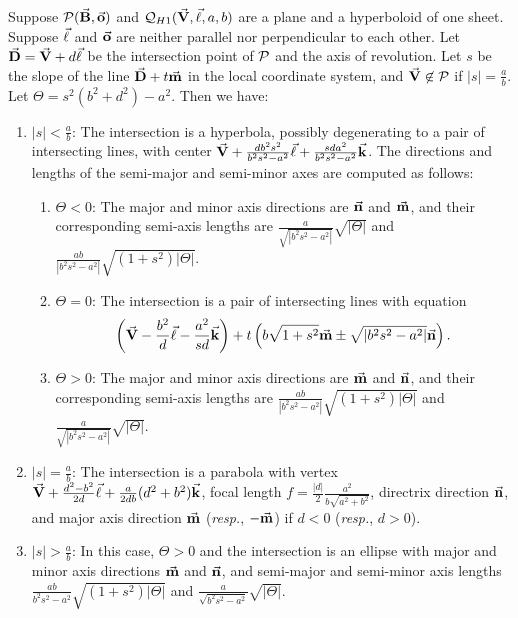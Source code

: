 \begin{theorem}
\label{thm:hy-1}
     Suppose ${\cal P}(\vec{\bf B},\vec{\bf o})$ and
${\cal Q}_{H1}(\vec{\bf V},\vec{\bf \ell},a,b)$ are a plane and a hyperboloid of
one sheet.  Suppose $\vec{\bf \ell}$ and $\vec{\bf o}$ are neither parallel nor
perpendicular to each other.  Let $\vec{\bf D}=\vec{\bf V}+d\vec{\bf \ell}$
be the intersection point of ${\cal P}$ and the axis of revolution.
Let $s$ be the slope of the line $\vec{\bf D}+t\vec{\bf m}$ in the local
coordinate system, and $\vec{\bf V}\not\in{\cal P}$ if
$|s|=\frac{a}{b}$.  Let $\Theta=s^2(b^2+d^2)-a^2$.  Then we have:
\begin{enumerate}
     \item $|s|<\frac{a}{b}$: The intersection is a hyperbola, possibly
          degenerating to a pair of intersecting lines, with center
          $\vec{\bf V}+\frac{db^2s^2}{b^2s^2-a^2}\vec{\bf \ell}+
          \frac{sda^2}{b^2s^2-a^2}\vec{\bf k}$.  The directions and lengths of
          the semi-major and semi-minor axes are computed as follows:
     \begin{enumerate}
          \item $\Theta<0$: The major and minor axis directions are
               $\vec{\bf n}$ and $\vec{\bf m}$, and their corresponding semi-axis
               lengths are $\frac{a}{\sqrt{|b^2s^2-a^2|}}\sqrt{|\Theta|}$ and
               $\frac{ab}{|b^2s^2-a^2|}\sqrt{(1+s^2)|\Theta|}$.
          \item \label{ref:enum-case} $\Theta=0$: The intersection is a pair of
               intersecting lines with equation
\[             \left(\vec{\bf V}-\frac{b^2}{d}\vec{\bf \ell}-
               \frac{a^2}{sd}\vec{\bf k}\right)+t\left(b\sqrt{1+s^2}\vec{\bf m}\pm
               \sqrt{|b^2s^2-a^2|}\vec{\bf n}\right). \]
          \item $\Theta>0$: The major and minor axis directions are
               $\vec{\bf m}$ and $\vec{\bf n}$, and their corresponding semi-axis
               lengths are $\frac{ab}{|b^2s^2-a^2|}\sqrt{(1+s^2)|\Theta|}$ and
               $\frac{a}{\sqrt{|b^2s^2-a^2|}}\sqrt{|\Theta|}$.
     \end{enumerate}
     \item $|s|=\frac{a}{b}$: The intersection is a parabola with vertex
          $\vec{\bf V}+\frac{d^2-b^2}{2d}\vec{\bf \ell}+
          \frac{a}{2db}(d^2+b^2)\vec{\bf k}$, focal length
          $f=\frac{|d|}{2}\frac{a^2}{b\sqrt{a^2+b^2}}$, directrix direction
          $\vec{\bf n}$, and major axis direction
          $\vec{\bf m}$ ({\em resp.}, $-\vec{\bf m}$) if $d<0$ ({\em resp.}, $d>0$).
     \item $|s|>\frac{a}{b}$: In this case, $\Theta>0$ and the intersection is
          an ellipse with major and minor axis directions $\vec{\bf m}$ and
          $\vec{\bf n}$, and semi-major and semi-minor axis lengths
          $\frac{ab}{b^2s^2-a^2}\sqrt{(1+s^2)|\Theta|}$ and
          $\frac{a}{\sqrt{b^2s^2-a^2}}\sqrt{|\Theta|}$.
\end{enumerate}
\end{theorem}
